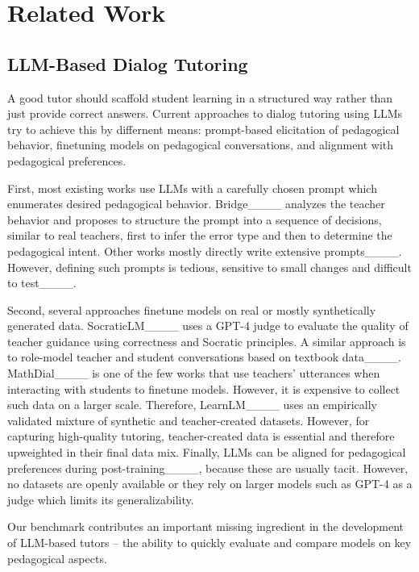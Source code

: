 \section{Related Work}
\subsection{LLM-Based Dialog Tutoring}
A good tutor should scaffold student learning in a structured way rather than just provide correct answers. 
Current approaches to dialog tutoring using LLMs try to achieve this by differnent means: prompt-based elicitation of pedagogical behavior, finetuning models on pedagogical conversations, and alignment with pedagogical preferences. 

First, most existing works use LLMs with a carefully chosen prompt which enumerates desired pedagogical behavior. Bridge____ analyzes the teacher behavior and proposes to structure the prompt into a sequence of decisions, similar to real teachers, first to infer the error type and then to determine the pedagogical intent. Other works mostly directly write extensive prompts____. However, defining such prompts is tedious, sensitive to small changes and difficult to test____.

Second, several approaches finetune models on real or mostly synthetically generated data.
SocraticLM____ uses a GPT-4 judge to evaluate the quality of teacher guidance using correctness and Socratic principles. A similar approach is to role-model teacher and student conversations based on textbook data____. MathDial____ is one of the few works that use teachers' utterances when interacting with students to finetune models. However, it is expensive to collect such data on a larger scale. Therefore, LearnLM____
uses an empirically validated mixture of synthetic and teacher-created datasets. However, for capturing high-quality tutoring, teacher-created data is essential and therefore upweighted in their final data mix.
Finally, LLMs can be aligned for pedagogical preferences during post-training____, because these are usually tacit. However, no datasets are openly available or they rely on larger models such as GPT-4 as a judge which limits its generalizability.

Our benchmark contributes an important missing ingredient in the development of LLM-based tutors -- the ability to quickly evaluate and compare models on key pedagogical aspects. 



